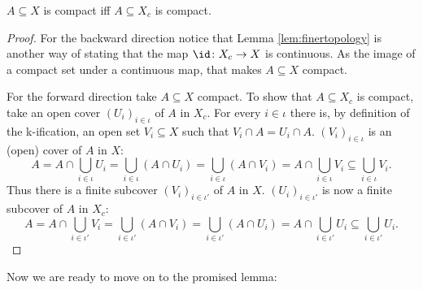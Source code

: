 \begin{lem}\label{lem:compactiffcompact}
    $A \subseteq X$ is compact iff $A \subseteq X_c$ is compact. 
    \href{https://github.com/scholzhannah/CWComplexes/blob/7be4872a05b534011cc969eb5b80a4b7f0bf57e2/CWcomplexes/KSpace.lean#L238-L243}{\faExternalLink}
\end{lem}
\begin{proof}
    For the backward direction notice that Lemma \ref{lem:finertopology} is another way of stating that the map $\id \colon X_c \to X$ is continuous. 
    As the image of a compact set under a continuous map, that makes $A \subseteq X$ compact. 

    For the forward direction take $A \subseteq X$ compact. 
    To show that $A \subseteq X_c$ is compact, take an open cover $(U_i)_{i \in \iota}$ of $A$ in $X_c$. 
    For every $i \in \iota$ there is, by definition of the k-ification, an open set $V_i \subseteq X$ such that $V_i \cap A = U_i \cap A$.  
    $(V_i)_{i \in \iota}$ is an (open) cover of $A$ in $X$: 
    \[A = A \cap \bigcup_{i \in \iota} U_i = \bigcup_{i \in \iota} (A \cap U_i) = \bigcup_{i \in \iota} (A \cap V_i) = A \cap \bigcup_{i \in \iota} V_i \subseteq \bigcup_{i \in \iota} V_i.\]
    Thus there is a finite subcover $(V_i)_{i \in \iota'}$ of $A$ in $X$.
    $(U_i)_{i \in \iota'}$ is now a finite subcover of $A$ in $X_c$: 
    \[A = A \cap \bigcup_{i \in \iota'} V_i = \bigcup_{i \in \iota'} (A \cap V_i) = \bigcup_{i \in \iota'} (A \cap U_i) = A \cap \bigcup_{i \in \iota'} U_i \subseteq \bigcup_{i \in \iota'} U_i.\]
\end{proof}

Now we are ready to move on to the promised lemma:

